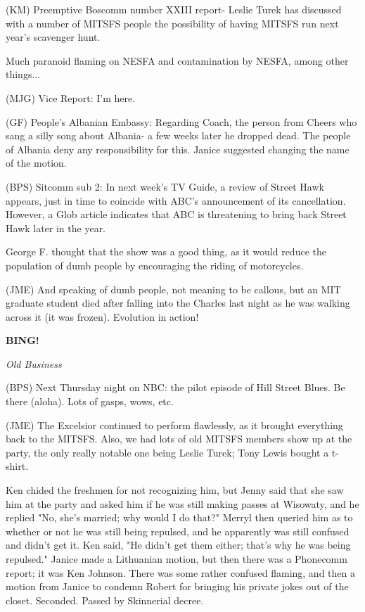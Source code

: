 \documentclass[12pt]{article}
\newcommand{\bing}{{\bf BING!} }
\newcommand{\goto}[1]{\bing \vskip 12pt \centerline{{\em{#1}}}}
\begin{document}
(KM) Preemptive Boscomm number XXIII report- Leslie Turek has discussed with a number of MITSFS people the possibility of having MITSFS run next year's scavenger hunt.

Much paranoid flaming on NESFA and contamination by NESFA, among other things...

(MJG) Vice Report: I'm here.

(GF) People's Albanian Embassy: Regarding Coach, the person from Cheers who sang a silly song about Albania- a few weeks later he dropped dead. The people of Albania deny any responsibility for this. Janice suggested changing the name of the motion.

(BPS) Sitcomm sub 2: In next week's TV Guide, a review of Street Hawk appears, just in time to coincide with ABC's announcement of its cancellation. However, a Glob article indicates that ABC is threatening to bring back Street Hawk later in the year.

George F. thought that the show was a good thing, as it would reduce the population of dumb people by encouraging the riding of motorcycles.

(JME) And speaking of dumb people, not meaning to be callous, but an MIT graduate student died after falling into the Charles last night as he was walking across it (it was frozen). Evolution in action!

\goto{Old Business}

(BPS) Next Thursday night on NBC: the pilot episode of Hill Street Blues. Be there (aloha). Lots of gasps, wows, etc.

(JME) The Excelsior continued to perform flawlessly, as it brought everything back to the MITSFS. Also, we had lots of old MITSFS members show up at the party, the only really notable one being Leslie Turek; Tony Lewis bought a t-shirt.

Ken chided the freshmen for not recognizing him, but Jenny said that she saw him at the party and asked him if he was still making passes at Wisowaty, and he replied "No, she's married; why would I do that?" Merryl then queried him as to whether or not he was still being repulsed, and he apparently was still confused and didn't get it. Ken said, "He didn't get them either; that's why he was being repulsed." Janice made a Lithuanian motion, but then there was a Phonecomm report; it was Ken Johnson. There was some rather confused flaming, and then a motion from Janice to condemn Robert for bringing his private jokes out of the closet. Seconded. Passed by Skinnerial decree.
\end{document}
